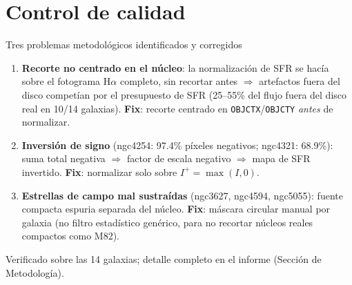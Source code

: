 \documentclass[12pt,aspectratio=169]{beamer}
\begin{document}
\section{Control de calidad}

\begin{frame}{Tres problemas metodológicos identificados y corregidos}
    \small
    \begin{enumerate}
        \item \textbf{Recorte no centrado en el núcleo}: la normalización
        de SFR se hacía sobre el fotograma H$\alpha$ completo, sin
        recortar antes $\Rightarrow$ artefactos fuera del disco competían
        por el presupuesto de SFR (25--55\% del flujo fuera del disco real
        en 10/14 galaxias). \textbf{Fix}: recorte centrado en
        \texttt{OBJCTX}/\texttt{OBJCTY} \emph{antes} de normalizar.
        \item \textbf{Inversión de signo} (ngc4254: 97.4\% píxeles
        negativos; ngc4321: 68.9\%): suma total negativa $\Rightarrow$
        factor de escala negativo $\Rightarrow$ mapa de SFR invertido.
        \textbf{Fix}: normalizar solo sobre $I^+=\max(I,0)$.
        \item \textbf{Estrellas de campo mal sustraídas} (ngc3627,
        ngc4594, ngc5055): fuente compacta espuria separada del núcleo.
        \textbf{Fix}: máscara circular manual por galaxia (no filtro
        estadístico genérico, para no recortar núcleos reales compactos
        como M82).
    \end{enumerate}
    \vfill
    \footnotesize Verificado sobre las 14 galaxias; detalle completo en el
    informe (Sección de Metodología).
\end{frame}
\end{document}
